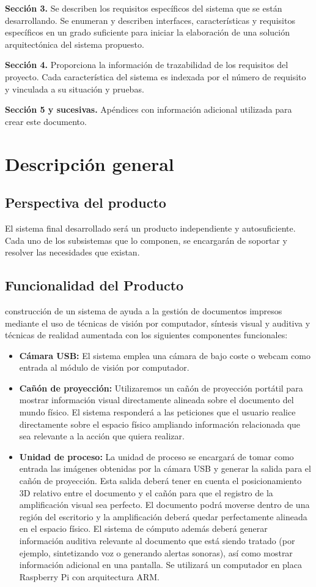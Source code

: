 \textbf{Sección 3.} Se describen los requisitos específicos del sistema que se están desarrollando. Se enumeran y describen interfaces, características y requisitos específicos en un grado suficiente para iniciar la elaboración de una solución arquitectónica del sistema propuesto.


\textbf{Sección 4.} Proporciona la información de trazabilidad de los requisitos del proyecto. Cada característica del sistema es indexada por el número de requisito y vinculada a su situación y pruebas. 

\textbf{Sección 5 y sucesivas.} Apéndices con información adicional utilizada para crear este documento.

\section{Descripción general}
\subsection{Perspectiva del producto}
El sistema final desarrollado será un producto independiente y autosuficiente. Cada uno de los subsistemas que lo componen, se encargarán de soportar y resolver las necesidades que existan. 

\subsection{Funcionalidad del Producto}
construcción de un sistema de ayuda a la gestión de documentos impresos mediante el uso de técnicas de visión por computador, síntesis visual y auditiva y técnicas de realidad
aumentada con los siguientes componentes funcionales:
\begin{itemize}
\item \textbf{Cámara USB:} El sistema emplea una cámara de bajo coste o webcam como entrada al módulo de visión por computador.
\item \textbf{Cañón de proyección:} Utilizaremos un cañón de proyección portátil para mostrar información visual directamente alineada sobre el documento del mundo físico. El sistema responderá a las peticiones que el usuario realice directamente sobre el espacio físico ampliando información relacionada que sea relevante a la acción que quiera realizar.
\item \textbf{Unidad de proceso:} La unidad de proceso se encargará de tomar como entrada las imágenes obtenidas por la cámara USB y generar la salida para el cañón de proyección. Esta salida deberá tener en cuenta el posicionamiento 3D relativo entre el documento y el cañón para que el registro de la amplificación visual sea perfecto. El documento podrá moverse dentro de una región del escritorio y la amplificación deberá quedar perfectamente alineada en el espacio físico. El sistema de cómputo además deberá generar información auditiva relevante al documento que está siendo tratado (por ejemplo, sintetizando voz o generando alertas sonoras), así como mostrar información adicional en una pantalla. Se utilizará un computador en placa Raspberry Pi con arquitectura ARM.
\end{itemize}

